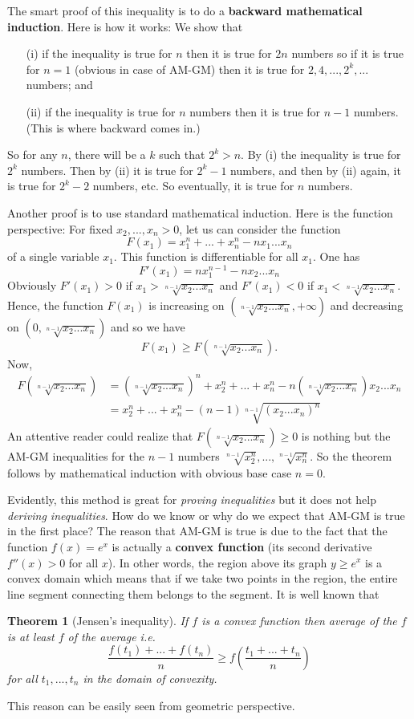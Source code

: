 \documentclass[10pt]{amsart}
\newtheorem{thm}{Theorem}
\begin{document}
The smart proof of this inequality is to do a \textbf{backward mathematical induction}. Here is how it works: We show that
\begin{itemize}
\item [(i)] if the inequality is true for $n$ then it is true for $2n$ numbers so if it is true for $n = 1$ (obvious in case of AM-GM) then it is true for $2, 4, ..., 2^k, ...$ numbers; and
\item [(ii)] if the inequality is true for $n$ numbers then it is true for $n-1$ numbers. (This is where backward comes in.)
\end{itemize}
So for any $n$, there will be a $k$ such that $2^k > n$. By (i) the inequality is true for $2^k$ numbers. Then by (ii) it is true for $2^k - 1$ numbers, and then by (ii) again, it is true for $2^k - 2$ numbers, etc. So eventually, it is true for $n$ numbers.

Another proof is to use standard mathematical induction. Here is the function perspective: For fixed $x_2, ..., x_n > 0$, let us can consider the function
$$F(x_1) = x_1^n + ... + x_n^n - n x_1 ... x_n$$
of a single variable $x_1$. This function is differentiable for all $x_1$. One has
$$F'(x_1) = n x_1^{n-1} - n x_2 ... x_n$$
Obviously $F'(x_1) > 0$ if $x_1 > \sqrt[n-1]{x_2 ... x_n}$ and $F'(x_1) < 0$ if $x_1 < \sqrt[n-1]{x_2 ... x_n}$. Hence, the function $F(x_1)$ is increasing on $(\sqrt[n-1]{x_2 ... x_n}, +\infty)$ and decreasing on $(0, \sqrt[n-1]{x_2 ... x_n})$ and so we have
$$F(x_1) \geq F(\sqrt[n-1]{x_2 ... x_n}).$$
Now,
\begin{align*}
F(\sqrt[n-1]{x_2 ... x_n}) &= (\sqrt[n-1]{x_2 ... x_n})^n + x_2^n + ... + x_n^n - n (\sqrt[n-1]{x_2 ... x_n}) x_2 ... x_n\\
&= x_2^n + ... + x_n^n - (n-1) \sqrt[n-1]{(x_2 ... x_n)^n}
\end{align*}
An attentive reader could realize that $F(\sqrt[n-1]{x_2 ... x_n}) \geq 0$ is nothing but the AM-GM inequalities for the $n-1$ numbers $\sqrt[n-1]{x_2^n}, ..., \sqrt[n-1]{x_n^n}$. So the theorem follows by mathematical induction with obvious base case $n = 0$.

Evidently, this method is great for \emph{proving inequalities} but it does not help \emph{deriving inequalities}. How do we know or why do we expect that AM-GM is true in the first place? The reason that AM-GM is true is due to the fact that the function $f(x) = e^x$ is actually a \textbf{convex function} (its second derivative $f''(x) > 0$ for all $x$). In other words, the region above its graph $y \geq e^x$ is a convex domain which means that if we take two points in the region, the entire line segment connecting them belongs to the segment. It is well known that
\begin{thm}[Jensen's inequality]
If $f$ is a convex function then average of the $f$ is at least $f$ of the average i.e.
$$\frac{f(t_1) + ... + f(t_n)}{n} \geq f\left(\frac{t_1 + ... + t_n}{n}\right)$$
for all $t_1, ..., t_n$ in the domain of convexity.
\end{thm}
This reason can be easily seen from geometric perspective.
\end{document}

